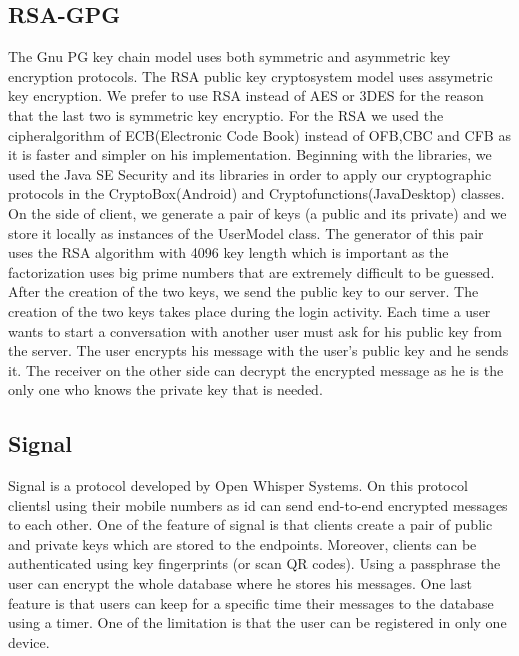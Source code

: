 \documentclass[11pt,a4paper]{report}
\begin{document}
\subsection{RSA-GPG}
The Gnu PG key chain model uses both symmetric and asymmetric key encryption protocols. The RSA public key cryptosystem model uses assymetric key encryption. We prefer to use RSA instead of AES or 3DES for the reason that the last two is symmetric key encryptio. For the RSA we used the cipheralgorithm of ECB(Electronic Code Book) instead of OFB,CBC and CFB as it is faster and simpler on his implementation. Beginning with the libraries, we used the Java SE Security and its libraries in order to apply our cryptographic protocols in the CryptoBox(Android) and Cryptofunctions(JavaDesktop) classes. On the side of client, we generate a pair of keys (a public and its private) and we store it locally as instances of the UserModel class. The generator of this pair uses the RSA algorithm with 4096 key length which is important as the factorization uses big prime numbers that are extremely difficult to be guessed. After the creation of the two keys, we send the public key to our server. The creation of the two keys takes place during the login activity. Each time a user wants to start a conversation with another user must ask for his public key from the server. The user encrypts his message with the user’s public key and he sends it. The receiver on the other side can decrypt the encrypted message as he is the only one who knows the private key that is needed.

\subsection{Signal}
Signal is a protocol developed by Open Whisper Systems. On this protocol clientsl using their mobile numbers as id can send end-to-end encrypted messages to each other. One of the feature of signal is that clients create a pair of public and private keys which are stored to the endpoints. Moreover, clients can be authenticated using key fingerprints (or scan QR codes). Using a passphrase the user can encrypt the whole database where he stores his messages. One last feature is that users can keep for a specific time their messages to the database using a timer. One of the limitation is that the user can be registered in only one device.
\end{document}
